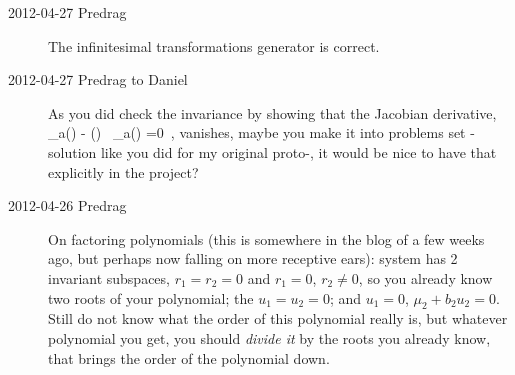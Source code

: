 \begin{description}
\item[2012-04-27 Predrag] The infinitesimal transformations
generator  is correct.

\item[2012-04-27 Predrag to Daniel] As you did check the invariance by showing that
the Jacobian derivative,
\beq
  \groupTan_a(\vel)  - \Mvar(\ssp) \, \groupTan_a(\ssp) =0
  \,,
vanishes, maybe you make it into problems set - solution like you did for
my original proto-{\twoMode}, it would be nice to have that explicitly in the
{\twoMode} project?

\item[2012-04-26 Predrag] On factoring polynomials (this is somewhere in
the blog of a few weeks ago, but perhaps now falling on more receptive
ears): {\twoMode} system has 2 invariant subspaces, $r_1=r_2=0$ and
$r_1=0$, $r_2\neq 0$, so you already know two roots of your polynomial;
the $u_1=u_2=0$; and $u_1=0$, $\mu_2  +b_2 u_2 =0$. Still do not know what the
order of this polynomial really is, but whatever polynomial you get, you
should \emph{divide it} by the roots you already know, that brings the
order of the polynomial down.


\end{description}
